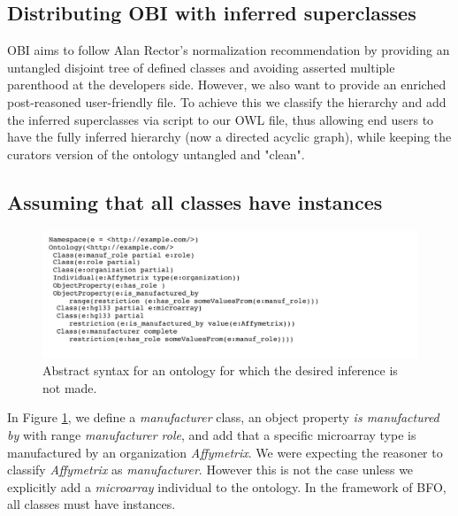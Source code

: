 \documentclass{elsart}       %
\begin{document}
\subsection{Distributing OBI with inferred superclasses}

OBI aims to follow Alan Rector's\cite{rector} normalization recommendation by providing an untangled disjoint tree of defined classes and avoiding asserted multiple parenthood at the developers side. However, we also want to provide an enriched post-reasoned user-friendly file.
To achieve this we classify the hierarchy and add the inferred superclasses via script to our OWL file, thus allowing end users to have the fully inferred hierarchy (now a directed acyclic graph), while keeping the curators version of the ontology untangled and "clean".

\subsection{Assuming that all classes have instances}

\begin{figure}[t]
\centering \includegraphics*[width=1\columnwidth]{instances}
\caption{Abstract syntax for an ontology for which the desired inference is not made.}
\label{fig:instances}
\end{figure}

In Figure \ref{fig:instances}, we define a \emph{manufacturer} class, an object property \emph{is manufactured by} with range \emph{manufacturer role}, and add that a specific microarray type is manufactured by an organization \emph{Affymetrix}.
We were expecting the reasoner to classify \emph{Affymetrix} as \emph{manufacturer}.
However this is not the case unless we explicitly add a \emph{microarray} individual to the ontology.
In the framework of BFO, all classes must have instances.

\end{document}
